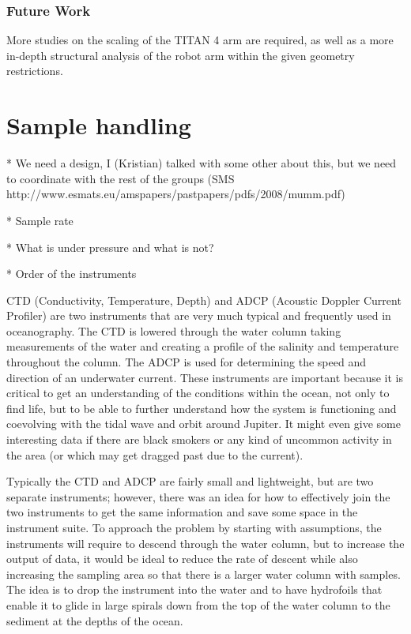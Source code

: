 \subsubsection{Future Work}
More studies on the scaling of the TITAN 4 arm are required, as well as a more in-depth structural analysis of the robot arm within the given geometry restrictions.  

\section{Sample handling}

* We need a design, I (Kristian) talked with some other about this, but we need to coordinate with the rest of the groups
   (SMS http://www.esmats.eu/amspapers/pastpapers/pdfs/2008/mumm.pdf)

* Sample rate

* What is under pressure and what is not?

* Order of the instruments



CTD (Conductivity, Temperature, Depth) and ADCP (Acoustic Doppler Current Profiler) are two instruments that are very much typical and frequently used in oceanography. The CTD is lowered through the water column taking measurements of the water and creating a profile of the salinity and temperature throughout the column. The ADCP is used for determining the speed and direction of an underwater current. These instruments are important because it is critical to get an understanding of the conditions within the ocean, not only to find life, but to be able to further understand how the system is functioning and coevolving with the tidal wave and orbit around Jupiter. It might even give some interesting data if there are black smokers or any kind of uncommon activity in the area (or which may get dragged past due to the current).

Typically the CTD and ADCP are fairly small and lightweight, but are two separate instruments; however, there was an idea for how to effectively join the two instruments to get the same information and save some space in the instrument suite. To approach the problem by starting with assumptions, the instruments will require to descend through the water column, but to increase the output of data, it would be ideal to reduce the rate of descent while also increasing the sampling area so that there is a larger water column with samples. The idea is to drop the instrument into the water and to have hydrofoils that enable it to glide in large spirals down from the top of the water column to the sediment at the depths of the ocean. 

